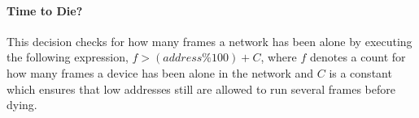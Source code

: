 \paragraph{Time to Die?}
This decision checks for how many frames a network has been alone by executing the following expression, $f > (address \% 100) + C$, where $f$ denotes a count for how many frames a device has been alone in the network and $C$ is a constant which ensures that low addresses still are allowed to run several frames before dying.

